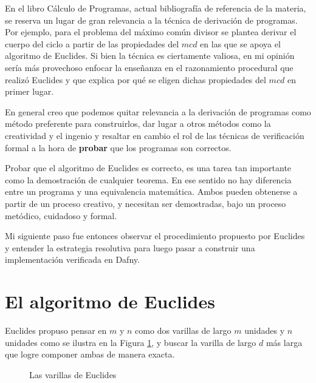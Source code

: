 \documentclass[12pt, a4paper, openany, fleqn]{book}
\begin{document}
    En el libro Cálculo de Programas, actual bibliografía de referencia de la materia, se reserva un lugar de gran relevancia a la técnica de derivación de programas. Por ejemplo, para el problema del máximo común divisor se plantea derivar el cuerpo del ciclo a partir de las propiedades del $mcd$ en las que se apoya el algoritmo de Euclides.
    Si bien la técnica es ciertamente valiosa, en mi opinión sería más provechoso enfocar la enseñanza en el razonamiento procedural que realizó Euclides y que explica por qué se eligen dichas propiedades del $mcd$ en primer lugar.

    En general creo que podemos quitar relevancia a la derivación de programas como método preferente para construirlos, dar lugar a otros métodos como la creatividad y el ingenio y resaltar en cambio el rol de las técnicas de verificación formal a la hora de \textbf{probar} que los programas son correctos.

    Probar que el algoritmo de Euclides es correcto, es una tarea tan importante como la demostración de cualquier teorema. En ese sentido no hay diferencia entre un programa y una equivalencia matemática. Ambos pueden obtenerse a partir de un proceso creativo, y necesitan ser demostradas, bajo un proceso metódico, cuidadoso y formal.

    Mi siguiente paso fue entonces observar el procedimiento propuesto por Euclides y entender la estrategia resolutiva para luego pasar a construir una implementación verificada en Dafny.

    \section{El algoritmo de Euclides}
    \label{desarrollo_euclides}
    Euclides propuso pensar en $m$ y $n$ como dos varillas de largo $m$ unidades y $n$ unidades como se ilustra en la Figura \ref{varillas_euclides}, y buscar la varilla de largo $d$ más larga que logre componer ambas de manera exacta.
    
    \begin{figure}[h]
        \centering
        \caption{Las varillas de Euclides} \label{varillas_euclides}
    \end{figure}
\end{document}
